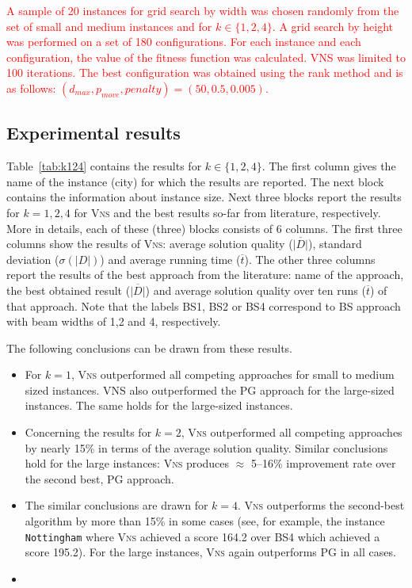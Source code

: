 \documentclass[dvipsnames,format=sigconf]{acmart} %
\begin{document}
	\textcolor{red}{A sample of 20 instances for grid search by width was chosen randomly from the set of small and medium instances and for  $k\in \{1, 2, 4\}$. A grid search by height was performed on a set of 180 configurations. For each instance and each configuration, the value of the fitness function was calculated. VNS was limited to 100 iterations. The best configuration   was obtained using the rank method and is as follows: $(d_{max}, p_{move}, penalty )=(50,0.5, 0.005)$.}

\subsection{Experimental results }
{ \color{red} Table~\ref{tab:k124} contains the results for $k \in \{1, 2,4\}$.  The first column gives the name of the instance (city) for which the results are reported. The next block contains the information about instance size. Next three blocks report the results for $k=1,2,4$ for \textsc{Vns} and the best results so-far from literature, respectively.  More in details, each of these (three) blocks consists of 6 columns. The first three columns show the results of \textsc{Vns}: average solution quality ($\overline{|D|}$), standard deviation ($\sigma(|D|)$) and average running time ($\overline{t}$).  The other three columns report  the results of the best approach from the literature:   name of the approach,  the best obtained  result ($\overline{|D|}$) and average solution quality over ten runs ($\overline{t}$) of that approach.  Note that the labels BS1, BS2 or BS4 correspond to BS approach with beam widths of 1,2 and 4, respectively. }
 
 
The following conclusions can be drawn from these results. 
   
\begin{itemize}
  		\item  For $k=1$, \textsc{Vns} outperformed all competing approaches for small to medium sized instances. VNS also outperformed the PG approach for the large-sized instances. {\color{red}The same holds for the large-sized instances. }
  		\item Concerning the results for $k=2$, \textsc{Vns} outperformed all competing approaches by nearly 15\% in terms of the average solution quality. Similar conclusions hold for the large instances: \textsc{Vns} produces $\approx$ 5--16\% improvement rate over the second best, PG approach. 
  		\item The similar {\color{red}conclusions are drawn} for $k=4$. \textsc{Vns} outperforms the second-best algorithm by more than 15\% in some cases (see, for example,  the instance \texttt{Nottingham} where \textsc{Vns} achieved a score 164.2 over BS4 which achieved a score 195.2). For the large instances, \textsc{Vns} again outperforms PG in all cases. 
  		\item {}
\end{itemize}
\end{document}
